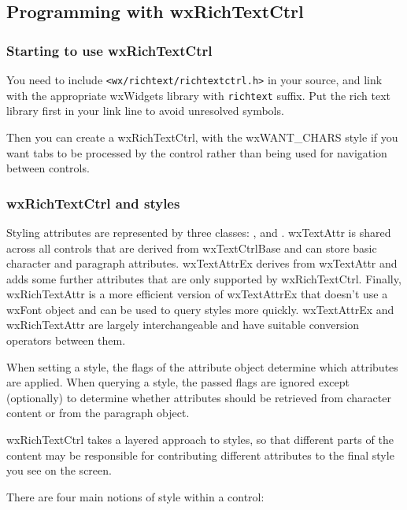 \subsection{Programming with wxRichTextCtrl}

\subsubsection{Starting to use wxRichTextCtrl}

You need to include {\tt <wx/richtext/richtextctrl.h>} in your source, and link
with the appropriate wxWidgets library with {\tt richtext} suffix. Put the rich text
library first in your link line to avoid unresolved symbols.

Then you can create a wxRichTextCtrl, with the wxWANT\_CHARS style if you want tabs to
be processed by the control rather than being used for navigation between controls.

\subsubsection{wxRichTextCtrl and styles}

Styling attributes are represented by three classes: ,  and .
wxTextAttr is shared across all controls that are derived from wxTextCtrlBase and
can store basic character and paragraph attributes. wxTextAttrEx derives
from wxTextAttr and adds some further attributes that are only supported
by wxRichTextCtrl. Finally, wxRichTextAttr is a more efficient version
of wxTextAttrEx that doesn't use a wxFont object and can be used to
query styles more quickly. wxTextAttrEx and wxRichTextAttr are largely
interchangeable and have suitable conversion operators between them.

When setting a style, the flags of the attribute object determine which
attributes are applied. When querying a style, the passed flags are ignored
except (optionally) to determine whether attributes should be retrieved from
character content or from the paragraph object.

wxRichTextCtrl takes a layered approach to styles, so that different parts of
the content may be responsible for contributing different attributes to the final
style you see on the screen.

There are four main notions of style within a control:

